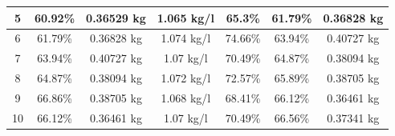 \begin{longtable}{|p{1cm}|p{1.7cm}|p{2cm}|p{2cm}|p{2cm}| p{1cm}| p{1cm}|}
             \multicolumn{1}{|c|}{5} 
             & \multicolumn{1}{c|}{60.92\%}  
             & \multicolumn{1}{c|}{0.36529 kg} 
             & \multicolumn{1}{c|}{1.065 kg/l}
             & \multicolumn{1}{c|}{65.3\%} 
             & \multicolumn{1}{c|}{61.79\%}             
             & \multicolumn{1}{c|}{0.36828 kg} \\
             \hline
             
             \multicolumn{1}{|c|}{6} 
             & \multicolumn{1}{c|}{61.79\%}  
             & \multicolumn{1}{c|}{0.36828 kg} 
             & \multicolumn{1}{c|}{1.074 kg/l}
             & \multicolumn{1}{c|}{74.66\%} 
             & \multicolumn{1}{c|}{63.94\%}             
             & \multicolumn{1}{c|}{0.40727 kg} \\
             \hline
             
             \multicolumn{1}{|c|}{7} 
             & \multicolumn{1}{c|}{63.94\%}  
             & \multicolumn{1}{c|}{0.40727 kg} 
             & \multicolumn{1}{c|}{1.07 kg/l}
             & \multicolumn{1}{c|}{70.49\%} 
             & \multicolumn{1}{c|}{64.87\%}
             & \multicolumn{1}{c|}{0.38094 kg} \\
             \hline
             
             \multicolumn{1}{|c|}{8} 
             & \multicolumn{1}{c|}{64.87\%}  
             & \multicolumn{1}{c|}{0.38094 kg} 
             & \multicolumn{1}{c|}{1.072 kg/l}
             & \multicolumn{1}{c|}{72.57\%}
             & \multicolumn{1}{c|}{65.89\%}
             & \multicolumn{1}{c|}{0.38705 kg} \\
             \hline
             
             \multicolumn{1}{|c|}{9} 
             & \multicolumn{1}{c|}{66.86\%}  
             & \multicolumn{1}{c|}{0.38705 kg} 
             & \multicolumn{1}{c|}{1.068 kg/l}
             & \multicolumn{1}{c|}{68.41\%}
             & \multicolumn{1}{c|}{66.12\%}
             & \multicolumn{1}{c|}{0.36461 kg} \\
             \hline
             
             \multicolumn{1}{|c|}{10} 
             & \multicolumn{1}{c|}{66.12\%} 
             & \multicolumn{1}{c|}{0.36461 kg} 
             & \multicolumn{1}{c|}{1.07 kg/l}
             & \multicolumn{1}{c|}{70.49\%}
             & \multicolumn{1}{c|}{66.56\%}
             & \multicolumn{1}{c|}{0.37341 kg} \\
             \hline
        
    \end{longtable}
    
